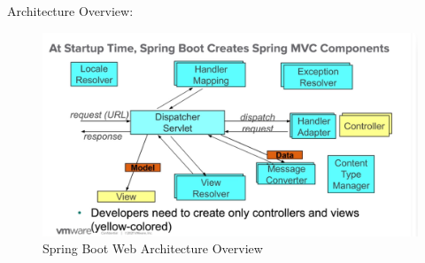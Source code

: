 \documentclass{scrartcl}
\begin{document}
Architecture Overview:

\begin{figure}
    \centering
    \includegraphics[width=1\linewidth]{spring-web}
    \caption{Spring Boot Web Architecture Overview}
    \label{fig:spring-web}
\end{figure}


\begin{lstlisting}

\end{lstlisting}

\begin{lstlisting}

\end{lstlisting}

\begin{lstlisting}

\end{lstlisting}

\begin{lstlisting}

\end{lstlisting}

\begin{lstlisting}

\end{lstlisting}

\begin{lstlisting}

\end{lstlisting}

\begin{lstlisting}

\end{lstlisting}
\end{document}
